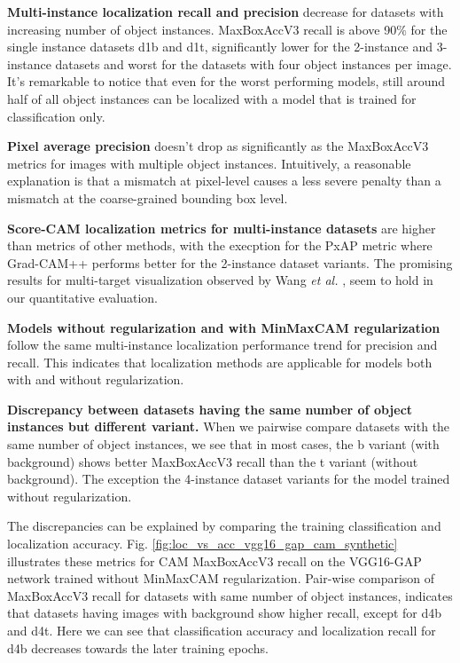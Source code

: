 \textbf{Multi-instance localization recall and precision} decrease for datasets with increasing number of object instances. MaxBoxAccV3 recall is above 90\% for the single instance datasets d1b and d1t, significantly lower for the 2-instance and 3-instance datasets and worst for the datasets with four object instances per image. It's remarkable to notice that even for the worst performing models, still around half of all object instances can be localized with a model that is trained for classification only. 

\textbf{Pixel average precision} doesn't drop as significantly as the MaxBoxAccV3 metrics for images with multiple object instances. Intuitively, a reasonable explanation is that a mismatch at pixel-level causes a less severe penalty than a mismatch at the coarse-grained bounding box level.

\textbf{Score-CAM localization metrics for multi-instance datasets} are higher than metrics of other methods, with the execption for the PxAP metric where Grad-CAM++ performs better for the 2-instance dataset variants. The promising results for multi-target visualization observed by Wang \textit{et al.} \cite{wang2020score}, seem to hold in our quantitative evaluation. 

\textbf{Models without regularization and with MinMaxCAM regularization} follow the same multi-instance localization performance trend for precision and recall. This indicates that localization methods are applicable for models both with and without regularization.

\textbf{Discrepancy between datasets having the same number of object instances but different variant.} When we pairwise compare datasets with the same number of object instances, we see that in most cases, the b variant (with background) shows better MaxBoxAccV3 recall than the t variant (without background). The exception the 4-instance dataset variants for the model trained without regularization.

The discrepancies can be explained by comparing the training classification and localization accuracy. Fig. \ref{fig:loc_vs_acc_vgg16_gap_cam_synthetic}  illustrates these metrics for CAM MaxBoxAccV3 recall on the VGG16-GAP network trained without MinMaxCAM regularization. Pair-wise comparison of MaxBoxAccV3 recall for datasets with same number of object instances, indicates that datasets having images with background show higher recall, except for d4b and d4t. Here we can see that classification accuracy and localization recall for d4b decreases towards the later training epochs.

